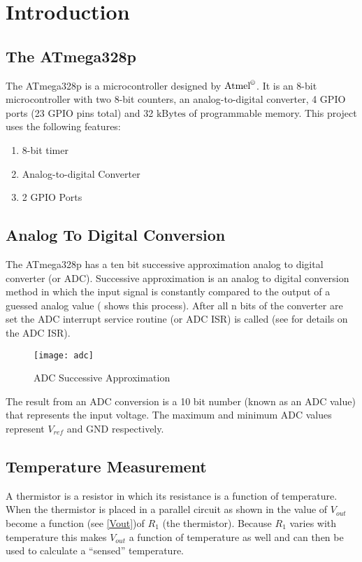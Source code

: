 \documentclass[main.tex]{subfiles}
\begin{document}
\chapter{Introduction}

\section{The ATmega328p}

	The ATmega328p is a microcontroller designed by $\mathrm{Atmel}^{\copyright}$.
	It is an 8-bit microcontroller with two 8-bit counters, an analog-to-digital
	converter, 4 GPIO ports (23 GPIO pins total) and 32 $\mathrm{kBytes}$ of
	programmable memory. This project uses the following features:

		\begin{enumerate}
			\item 8-bit timer
			\item Analog-to-digital Converter
			\item 2 GPIO Ports 
		\end{enumerate}

	\section{Analog To Digital Conversion}\label{sec:ADC}
	The ATmega328p has a ten bit successive approximation analog to digital
	converter (or ADC). Successive approximation is an analog to digital
	conversion method in which the input signal is constantly compared to the
	output of a guessed analog value ( shows this process). After
	all n bits of the converter are set the ADC interrupt service routine (or ADC
	ISR) is called (see  for details on the ADC ISR). 

	\begin{figure}[H]
		\begin{center}
			\texttt{[image: adc]}
		\end{center}
		\caption{ADC Successive Approximation}
		\label{fig:adcSA}
	\end{figure}

	The result from an ADC conversion is a 10 bit number (known as an ADC value)
	that represents the input voltage. The maximum and minimum ADC values
	represent $V_{ref}$ and $\mathrm{GND}$ respectively.
		
	\section{Temperature Measurement}
	A thermistor is a resistor in which its resistance is a function of
	temperature. When the thermistor is placed in a parallel circuit as shown in
	 the value of $V_{out}$ become a function (see
	\eqref{Vout})of $R_{1}$ (the thermistor). Because $R_{1}$ varies with
	temperature this makes $V_{out}$ a function of temperature as well and can
	then be used to calculate a ``sensed'' temperature.
	
\end{document}
